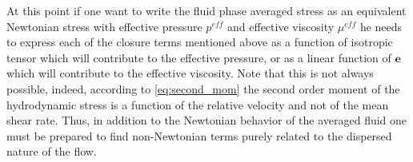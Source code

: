 
At this point if one want to write the fluid phase averaged stress as an equivalent Newtonian stress with effective pressure $p^{eff}$ and effective viscosity $\mu^{eff}$ he needs to express each of the closure terms mentioned above as a function of isotropic tensor which will contribute to the effective pressure, or as a linear function of  $\textbf{e}$ which will contribute to the effective viscosity. 
Note that this is not always possible, indeed, according to \ref{eq:second_mom} the second order moment of the hydrodynamic stress is a function of the relative velocity and not of the mean shear rate. 
Thus, in addition to the Newtonian behavior of the averaged fluid one must be prepared to find non-Newtonian terms purely related to the dispersed nature of the flow. 

